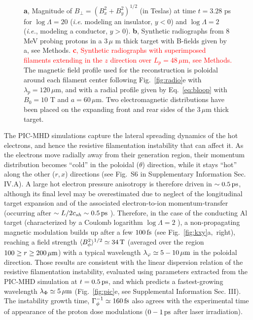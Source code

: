 \documentclass[aps,twocolumn,showpacs,superscriptaddress]{revtex4}
\begin{document}
\begin{figure}
{\textbf{a}, Magnitude of $B_\perp=(B_x^2+B_y^2)^{1/2}$ (in Teslas) at time $t=3.28$ ps for $\log \Lambda=20$ (\emph{i.e.} modeling an insulator, $y<0$) and $\log\Lambda=2$ (\emph{i.e.}, modeling a conductor, $y>0$).
\textbf{b}, Synthetic radiographs from $8$ MeV probing protons in a 
$3\, \mu$ m thick target with B-fields given by a, see Methods.
\textcolor{red}{
\textbf{c}, Synthetic radiographs with superimposed filaments extending in the $z$ direction over $L_p = 48\,\mu$m, see Methods.} 
The magnetic field profile used for the reconstruction is poloidal around each filament center following Fig.~\ref{fig:radio}e with $\lambda_p = 120\, \mu$m, and with a radial profile given by Eq.~\eqref{eq:bloop} with $B_0=10$ T and $a = 60\, \mu$m. Two electromagnetic distributions have been placed on the expanding front and rear sides of the $3\,\mu$m thick target.
}
\end{figure}

The PIC-MHD simulations capture the lateral spreading dynamics of the hot electrons, and hence the resistive filamentation instability that can affect it. As the electrons move radially away from their generation region, their momentum distribution becomes ``cold'' in the poloidal ($\theta$) direction, while it stays ``hot'' along the other ($r,x$) directions (see Fig.~S6 in Supplementary Information Sec. IV.A). A large hot electron pressure anisotropy is therefore driven in $\sim 0.5\,\rm ps$, although its final level may be overestimated due to neglect of the longitudinal target expansion and of the associated electron-to-ion momentum-transfer (occurring after $\sim L/2c_{sh} \sim 0.5\,\rm ps$ \cite{PRE_Mora_2005}). Therefore, in the case of the conducting Al target (characterized by a Coulomb logarithm $\log \Lambda = 2$ \cite{POF_Lee_1984}), a non-propagating magnetic modulation builds up after a few $100\,\rm fs$ (see \mbox{Fig.~\ref{fig:kxy}a, right}), reaching a field strength $\langle B_\phi^2\rangle^{1/2}\simeq 34\,\rm T$ (averaged over the region $100 \ge r \ge 200\,\mu \rm m$) with a typical wavelength $\lambda_\varphi \simeq 5-10\,\rm \mu m$  in the poloidal direction. Those results are consistent with the linear dispersion relation of the resistive filamentation instability, evaluated using parameters extracted from the PIC-MHD simulation at $t=0.5\,\rm ps$, and which predicts a fastest-growing wavelength $\lambda_\Phi \simeq 5\,\mu \rm m$ (Fig.~\ref{fig:pic}e, see Supplemental Information Sec. III). The instability growth time, $\Gamma_\phi^{-1}\simeq 160\,\rm fs$ also agrees with the experimental time of appearance of the proton dose modulations ($0-1\,\rm ps$ after laser irradiation).
\end{document}
